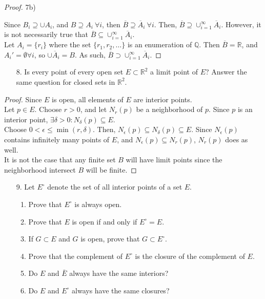\documentclass[10pt]{article}
\theoremstyle{definition}
\theoremstyle{plain}
\newcommand{\Q}{\mathbb{Q}}
\newcommand{\R}{\mathbb{R}}
\begin{document}
\begin{proof}
7b)

Since $B_i \supseteq \cup A_i$, and $B \supseteq A_i\ \forall i$, then $\overline{B} \supseteq \overline{A}_i\ \forall i$. Then, $\overline{B} \supseteq \cup^{\infty}_{i=1} \overline{A}_i$. However, it is not necessarily true that $\overline{B} \subseteq \cup^{\infty}_{i=1} \overline{A}_i$. \\

Let $A_i = \{r_i\}$ where the set $\{r_1, r_2, \dots\}$ is an enumeration of $\Q$. Then $\overline{B} = \R$, and $A_i' = \emptyset \forall i$, so $\cup \overline{A}_i = B$. As such, $\overline{B} \supset \cup^{\infty}_{i=1} \overline{A}_i$.
\end{proof}


\pagebreak



\begin{enumerate}
\item[8.] Is every point of every open set $E \subset \R^2$ a limit point of $E$? Answer the same question for closed sets in $\R^2$.
\end{enumerate}

\begin{proof}
Since $E$ is open, all elements of $E$ are interior points. \\

Let $p\in E$. Choose $r>0$, and let $N_r(p)$ be a neighborhood of $p$. Since $p$ is an interior point, $\exists \delta > 0: N_\delta (p) \subseteq E$. \\

Choose $0<\epsilon \leq \min(r,\delta)$. Then, $N_\epsilon (p) \subseteq N_\delta (p) \subseteq E$. Since $N_\epsilon (p)$ contains infinitely many points of $E$, and $N_\epsilon (p) \subseteq N_r (p)$, $N_r(p)$ does as well. \\

It is not the case that any finite set $B$ will have limit points since the neighborhood intersect $B$ will be finite.
\end{proof}




\pagebreak




\begin{enumerate}
\item[9.] Let $E^\circ$ denote the set of all interior points of a set $E$.
\begin{enumerate}
  \item Prove that $E^\circ$ is always open.
  \item Prove that $E$ is open if and only if $E^\circ = E$.
  \item If $G \subset E$ and $G$ is open, prove that $G\subset E^\circ$.
  \item Prove that the complement of $E^\circ$ is the closure of the complement of $E$.
  \item Do $E$ and $\bar{E}$ always have the same interiors?
  \item Do $E$ and $E^\circ$ always have the same closures?
\end{enumerate}
\end{enumerate}
\end{document}
